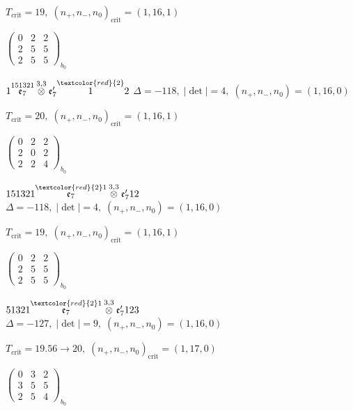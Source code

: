 \documentclass[10pt]{article}
\begin{document}
\hspace{1em}$T_{\text{crit}}=19,\; (n_+,n_-,n_0)_{\text{crit}}=(1,16,1)$

\hspace{2em}$\left(\begin{smallmatrix}0 & 2 & 2 \\ 2 & 5 & 5 \\ 2 & 5 & 5\end{smallmatrix}\right)_{\!b_0}$

\smallskip

$1\overset{151321}{\mathfrak{e}_7}\overset{3,3}{\otimes}\mathfrak{e}_7'\overset{\textcolor{red}{2}}{1}2$ \quad $\Delta=-118,\; |\det|=4,\; (n_+,n_-,n_0)=(1,16,0)$

\hspace{1em}$T_{\text{crit}}=20,\; (n_+,n_-,n_0)_{\text{crit}}=(1,16,1)$

\hspace{2em}$\left(\begin{smallmatrix}0 & 2 & 2 \\ 2 & 0 & 2 \\ 2 & 2 & 4\end{smallmatrix}\right)_{\!b_0}$

$151321\overset{\textcolor{red}{2}1}{\mathfrak{e}_7}\overset{3,3}{\otimes}\mathfrak{e}_7'12$ \quad $\Delta=-118,\; |\det|=4,\; (n_+,n_-,n_0)=(1,16,0)$

\hspace{1em}$T_{\text{crit}}=19,\; (n_+,n_-,n_0)_{\text{crit}}=(1,16,1)$

\hspace{2em}$\left(\begin{smallmatrix}0 & 2 & 2 \\ 2 & 5 & 5 \\ 2 & 5 & 5\end{smallmatrix}\right)_{\!b_0}$

\smallskip

$51321\overset{\textcolor{red}{2}1}{\mathfrak{e}_7}\overset{3,3}{\otimes}\mathfrak{e}_7'123$ \quad $\Delta=-127,\; |\det|=9,\; (n_+,n_-,n_0)=(1,16,0)$

\hspace{1em}$T_{\text{crit}}=19.56 \to 20,\; (n_+,n_-,n_0)_{\text{crit}}=(1,17,0)$

\hspace{2em}$\left(\begin{smallmatrix}0 & 3 & 2 \\ 3 & 5 & 5 \\ 2 & 5 & 4\end{smallmatrix}\right)_{\!b_0}$
\end{document}
